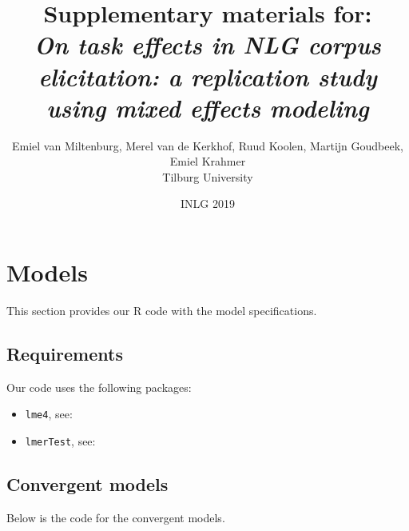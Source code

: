 \documentclass[11pt]{article}
\begin{document}
\title{\textbf{Supplementary materials for:}\\\large \textit{On task effects in NLG corpus elicitation: a replication study using mixed effects modeling}}
\author{Emiel van Miltenburg, Merel van de Kerkhof, Ruud Koolen, Martijn Goudbeek, Emiel Krahmer\\Tilburg University}
\date{INLG 2019}
\maketitle

\section{Models}
This section provides our R code with the model specifications.

\subsection{Requirements}
Our code uses the following packages:
\begin{itemize}
\item \texttt{lme4}, see: \citealt{lme4}
\item \texttt{lmerTest}, see: \citealt{lmertest}
\end{itemize}

\subsection{Convergent models}
Below is the code for the convergent models.
\end{document}
